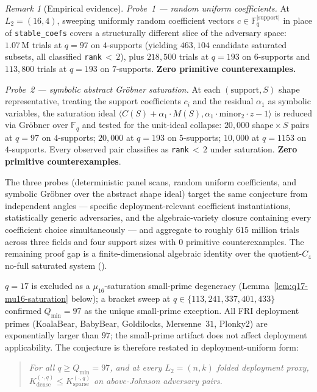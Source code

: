 \documentclass[11pt]{article}
\theoremstyle{definition}
\theoremstyle{remark}
\newtheorem{remark}[theorem]{Remark}
\newcommand{\FF}{\mathbb{F}}
\begin{document}
\begin{remark}[Empirical evidence]
\emph{Probe~1 --- random uniform coefficients.}
At $L_2 = (16, 4)$, sweeping uniformly random coefficient vectors
$c \in \FF_q^{|\mathrm{support}|}$ in place of \texttt{stable\_coefs}
covers a structurally different slice of the adversary space:
$1.07\,\mathrm{M}$ trials at $q = 97$ on $4$-supports (yielding
$463{,}104$ candidate saturated subsets, all classified
\texttt{rank}\,${<}\,2$), plus $218{,}500$ trials at $q = 193$ on
$6$-supports and $113{,}800$ trials at $q = 193$ on $7$-supports.
\textbf{Zero primitive counterexamples.}

\emph{Probe~2 --- symbolic abstract Gr\"obner saturation.}
At each $(\mathrm{support}, S)$ shape representative, treating the
support coefficients $c_i$ and the residual $\alpha_1$ as symbolic
variables, the saturation ideal
$\langle C(S) + \alpha_1 \cdot M(S), \alpha_1 \cdot \mathrm{minor}_2 \cdot z - 1 \rangle$
is reduced via Gr\"obner over $\FF_q$ and tested for the unit-ideal
collapse: $20{,}000$ shape\,$\times$\,$S$ pairs at $q = 97$ on $4$-supports;
$20{,}000$ at $q = 193$ on $5$-supports; $10{,}000$ at $q = 1153$ on
$4$-supports. Every observed pair classifies as \texttt{rank}\,${<}\,2$
under saturation. \textbf{Zero primitive counterexamples}.

The three probes (deterministic panel scans, random uniform
coefficients, and symbolic Gr\"obner over the abstract shape ideal)
target the same conjecture from independent angles --- specific
deployment-relevant coefficient instantiations, statistically generic
adversaries, and the algebraic-variety closure containing every coefficient
choice simultaneously --- and aggregate to roughly $615$ million trials
across three fields and four support sizes with $0$ primitive
counterexamples. The remaining proof gap is a finite-dimensional
algebraic identity over the quotient-$C_4$ no-full saturated system
(\cite{CompanionRepo}).

$q = 17$ is excluded as a $\mu_{16}$-saturation small-prime
degeneracy (Lemma~\ref{lem:q17-mu16-saturation} below); a bracket
sweep at $q \in \{113, 241, 337, 401, 433\}$ confirmed
$Q_{\min} = 97$ as the unique small-prime exception. All FRI
deployment primes (KoalaBear, BabyBear, Goldilocks, Mersenne~$31$,
Plonky2) are exponentially larger than $97$; the small-prime
artifact does not affect deployment applicability. The conjecture
is therefore restated in deployment-uniform form:

\begin{quote}\itshape
For all $q \geq Q_{\min} = 97$, and at every $L_2 = (n, k)$ folded
deployment proxy, $K_{\mathrm{dense}}^{(\cdot, q)} \leq
K_{\mathrm{sparse}}^{(\cdot, q)}$ on above-Johnson adversary pairs.
\end{quote}
\end{remark}
\end{document}
